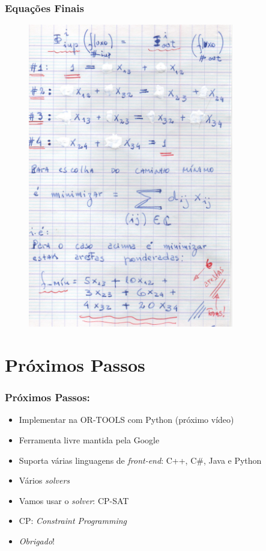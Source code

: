 \documentclass{beamer}
\begin{document}
\begin{frame}
	\frametitle{Equações Finais}
	
	\begin{figure}[tbp]
		\includegraphics[width=0.8\textwidth , height=0.8\textheight]{09_equacoes_finais.pdf}
		\centering
	\end{figure}
\end{frame}

\section{Próximos Passos}

\begin{frame} 
	\frametitle{Próximos Passos:}
	
\begin{block}{}
	
	\begin{itemize}
		\item Implementar na OR-TOOLS  com Python (próximo vídeo)
		\item Ferramenta livre mantida pela Google
		\item Suporta várias linguagens de \textit{front-end}: C++, C\#, Java e Python
		\item Vários \textit{solvers}
		\item Vamos usar o {\em solver}: CP-SAT
		\item CP: \textit{Constraint Programming}
				
		\item \textit{Obrigado}!
		
	\end{itemize}
\end{block}
\end{frame}
\end{document}
